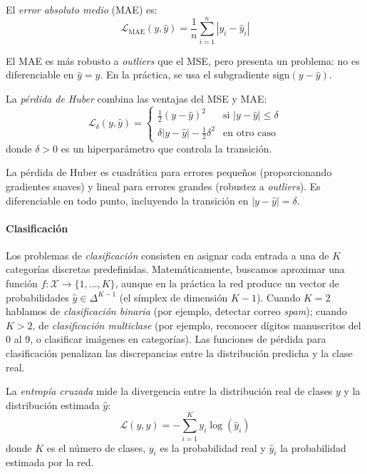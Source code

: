 \begin{definition}\label{def:mae}
	El \textit{error absoluto medio} (\gls{MAE}) es:
	\[
		\mathcal{L}_{\text{MAE}}(y, \hat{y}) = \frac{1}{n} \sum_{i=1}^{n} |y_i - \hat{y}_i|
	\]
\end{definition}

El \gls{MAE} es más robusto a \textit{outliers} que el \gls{MSE}, pero presenta un problema: no es diferenciable en \(\hat{y} = y\). En la práctica, se usa el subgradiente \(\text{sign}(y - \hat{y})\).

\begin{definition}\label{def:huber}
	La \textit{pérdida de Huber} combina las ventajas del \gls{MSE} y \gls{MAE}:
	\[
		\mathcal{L}_{\delta}(y, \hat{y}) = \begin{cases}
			\frac{1}{2}(y - \hat{y})^2 & \text{si } |y - \hat{y}| \leq \delta \\
			\delta |y - \hat{y}| - \frac{1}{2}\delta^2 & \text{en otro caso}
		\end{cases}
	\]
	donde \(\delta > 0\) es un hiperparámetro que controla la transición.
\end{definition}

La pérdida de Huber es cuadrática para errores pequeños (proporcionando gradientes suaves) y lineal para errores grandes (robustez a \textit{outliers}). Es diferenciable en todo punto, incluyendo la transición en \(|y - \hat{y}| = \delta\).

\paragraph{Clasificación}

Los problemas de \textit{clasificación} consisten en asignar cada entrada a una de \(K\) categorías discretas predefinidas. Matemáticamente, buscamos aproximar una función \(f: \mathcal{X} \to \{1, \ldots, K\}\), aunque en la práctica la red produce un vector de probabilidades \(\hat{y} \in \Delta^{K-1}\) (el símplex de dimensión \(K-1\)). Cuando \(K = 2\) hablamos de \textit{clasificación binaria} (por ejemplo, detectar correo \textit{spam}); cuando \(K > 2\), de \textit{clasificación multiclase} (por ejemplo, reconocer dígitos manuscritos del 0 al 9, o clasificar imágenes en categorías). Las funciones de pérdida para clasificación penalizan las discrepancias entre la distribución predicha y la clase real.

\begin{definition}\label{def:cross_entropy}
	La \textit{entropía cruzada} mide la divergencia entre la distribución real de clases \(y\) y la distribución estimada \(\hat{y}\):
	\begin{equation}
		\mathcal{L}(y, \hat{y}) = -\sum_{i=1}^{K} y_i \log(\hat{y}_i)
		\label{eq:cross_entropy}
	\end{equation}
	donde $K$ es el número de clases, \(y_i\) es la probabilidad real y \(\hat{y}_i\) la probabilidad estimada por la red.
\end{definition}

